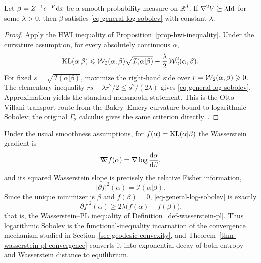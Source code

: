 \begin{prop}\label{prop-curvature-log-sobolev}
	Let \(\beta=Z^{-1}e^{-V}\mathrm{d} x\) be a smooth probability measure on \(\mathbb{R}^d\). If \(\nabla^2V\succeq\lambda\mathrm{Id}\) for some \(\lambda>0\), then \(\beta\) satisfies \eqref{eq-general-log-sobolev} with constant \(\lambda\).
\end{prop}

\begin{proof}
	Apply the HWI inequality of Proposition~\ref{prop-hwi-inequality}. Under the curvature assumption, for every absolutely continuous \(\alpha\),
	\[
		\operatorname{KL}(\alpha|\beta)
		\leqslant
		\operatorname{\mathcal{W}}_2(\alpha,\beta)\sqrt{\mathcal I(\alpha|\beta)}
		-
		\frac{\lambda}{2}\operatorname{\mathcal{W}}_2^2(\alpha,\beta).
	\]
	For fixed \(s=\sqrt{\mathcal I(\alpha|\beta)}\), maximize the right-hand side over \(r=\operatorname{\mathcal{W}}_2(\alpha,\beta)\geqslant0\). The elementary inequality \(rs-\lambda r^2/2\leq s^2/(2\lambda)\) gives \eqref{eq-general-log-sobolev}. Approximation yields the standard nonsmooth statement. This is the Otto--Villani transport route from the Bakry--Emery curvature bound to logarithmic Sobolev; the original \(\Gamma_2\) calculus gives the same criterion directly~\cite{BakryEmery1985Diffusions,OttoVillani2000Generalization,BakryGentilLedoux2014Markov}.
\end{proof}

\begin{rem}\label{rem-lsi-wasserstein-pl}
	Under the usual smoothness assumptions, for \(f(\alpha)=\operatorname{KL}(\alpha|\beta)\) the Wasserstein gradient is
	\[
		\mathord{\nabla\mkern-9.3mu\nabla} f(\alpha)
		=
		\nabla\log\frac{\mathrm{d}\alpha}{\mathrm{d}\beta},
	\]
	and its squared Wasserstein slope is precisely the relative Fisher information,
	\[
		|\partial f|^2(\alpha)=\mathcal I(\alpha|\beta).
	\]
	Since the unique minimizer is \(\beta\) and \(f(\beta)=0\), \eqref{eq-general-log-sobolev} is exactly
	\[
		|\partial f|^2(\alpha)
		\geq
		2\lambda\bigl(f(\alpha)-f(\beta)\bigr),
	\]
	that is, the Wasserstein--PL inequality of Definition~\ref{def-wasserstein-pl}. Thus logarithmic Sobolev is the functional-inequality incarnation of the convergence mechanism studied in Section~\ref{sec-geodesic-convexity}, and Theorem~\ref{thm-wasserstein-pl-convergence} converts it into exponential decay of both entropy and Wasserstein distance to equilibrium.
\end{rem}

